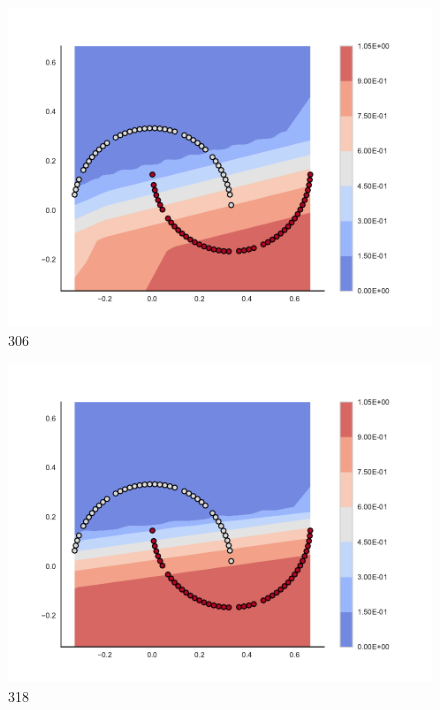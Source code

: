 \begin{subfigure}[b]{0.09\textwidth}
    \includegraphics[width=\textwidth]{img/convergence/306.pdf}
    \caption{306}
    \label{fig:convergence_306}
\end{subfigure}
%
\begin{subfigure}[b]{0.09\textwidth}
    \includegraphics[width=\textwidth]{img/convergence/318.pdf}
    \caption{318}
    \label{fig:convergence_318}
\end{subfigure}
%
